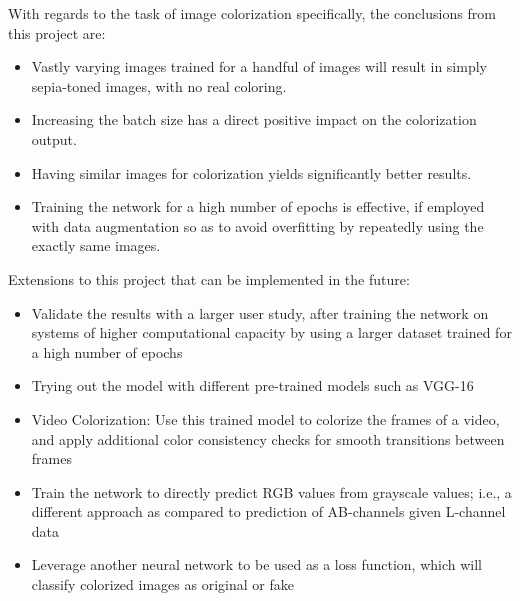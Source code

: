 \documentclass[10pt,twocolumn,letterpaper]{article}
\begin{document}
	With regards to the task of image colorization specifically, the conclusions from this project are:
	\begin{itemize}
		\item Vastly varying images trained for a handful of images will result in simply sepia-toned images, with no real coloring.
		\item Increasing the batch size has a direct positive impact on the colorization output.
		\item Having similar images for colorization yields significantly better results.
		\item Training the network for a high number of epochs is effective, if employed with data augmentation so as to avoid overfitting by repeatedly using the exactly same images.
	\end{itemize}

	Extensions to this project that can be implemented in the future:
	\begin{itemize}
		\item Validate the results with a larger user study, after training the network on systems of higher computational capacity by using a larger dataset trained for a high number of epochs
		\item Trying out the model with different pre-trained models such as VGG-16
		\item Video Colorization: Use this trained model to colorize the frames of a video, and apply additional color consistency checks for smooth transitions between frames
		\item Train the network to directly predict RGB values from grayscale values; i.e., a different approach as compared to prediction of AB-channels given L-channel data
		\item Leverage another neural network to be used as a loss function, which will classify colorized images as original or fake
	\end{itemize}

	\newpage
\end{document}
